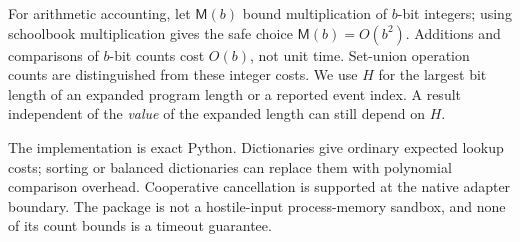 For arithmetic accounting, let $\mathsf M(b)$ bound multiplication of
$b$-bit integers; using schoolbook multiplication gives the safe choice
$\mathsf M(b)=O(b^2)$. Additions and comparisons of $b$-bit counts cost
$O(b)$, not unit time. Set-union operation counts are distinguished from
these integer costs. We use $H$ for the largest bit length of an expanded
program length or a reported event index. A result independent of the
\emph{value} of the expanded length can still depend on $H$.

The implementation is exact Python. Dictionaries give ordinary expected
lookup costs; sorting or balanced dictionaries can replace them with
polynomial comparison overhead. Cooperative cancellation is supported at the
native adapter boundary. The package is not a hostile-input process-memory
sandbox, and none of its count bounds is a timeout guarantee.
